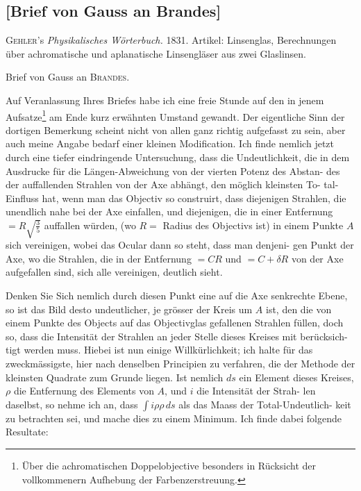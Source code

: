 \documentclass[12pt,a4paper]{article}
\begin{document}
\subsection*{[Brief von Gauss an Brandes]}

\textsc{Gehler}'s \textit{Physikalisches Wörterbuch.} 1831. Artikel: 
Linsenglas, Berechnungen über achromatische und aplanatische Linsengläser aus zwei Glaslinsen.

Brief von Gauss an \textsc{Brandes}.

Auf Veranlassung Ihres Briefes habe ich eine freie Stunde auf den in jenem 
Aufsatze\footnote{Über die achromatischen Doppelobjective besonders in Rücksicht der vollkommenern Aufhebung der Farbenzerstreuung.} am Ende kurz erwähnten Umstand gewandt. Der eigentliche Sinn 
der dortigen Bemerkung scheint nicht von allen ganz richtig aufgefasst zu sein, 
aber auch meine Angabe bedarf einer kleinen Modification. Ich finde nemlich 
jetzt durch eine tiefer eindringende Untersuchung, dass die Undeutlichkeit, die 
in dem Ausdrucke für die Längen-Abweichung von der vierten Potenz des Abstan-
des der auffallenden Strahlen von der Axe abhängt, den möglich kleinsten To-
tal-Einfluss hat, wenn man das Objectiv so construirt, dass diejenigen Strahlen, 
die unendlich nahe bei der Axe einfallen, und diejenigen, die in einer Entfernung 
$= R\sqrt{\tfrac{3}{5}}$ auffallen würden, (wo $R =$ Radius des Objectivs ist) in einem 
Punkte $A$ sich vereinigen, wobei das Ocular dann so steht, dass man denjeni-
gen Punkt der Axe, wo die Strahlen, die in der Entfernung $= CR$ und 
$= C + \delta R$ von der Axe aufgefallen sind, sich alle vereinigen, deutlich sieht.

Denken Sie Sich nemlich durch diesen Punkt eine auf die Axe senkrechte Ebene, 
so ist das Bild desto undeutlicher, je grösser der Kreis um $A$ ist, den die von 
einem Punkte des Objects auf das Objectivglas gefallenen Strahlen füllen, doch 
so, dass die Intensität der Strahlen an jeder Stelle dieses Kreises mit berücksich-
tigt werden muss. Hiebei ist nun einige Willkürlichkeit; ich halte für das 
zweckmässigste, hier nach denselben Principien zu verfahren, die der Methode 
der kleinsten Quadrate zum Grunde liegen. Ist nemlich $ds$ ein Element dieses 
Kreises, $\rho$ die Entfernung des Elements von $A$, und $i$ die Intensität der Strah-
len daselbst, so nehme ich an, dass $\int i\rho\rho\,ds$ als das Maass der Total-Undeutlich-
keit zu betrachten sei, und mache dies zu einem Minimum. Ich finde dabei 
folgende Resultate:
\end{document}
